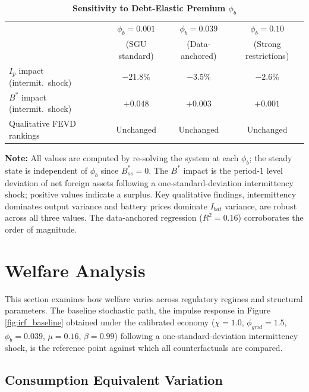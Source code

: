 	\begin{table}[H]
		\centering
		\caption[Sensitivity to Debt-Elastic Premium $\phi_b$]{\textbf{Sensitivity to Debt-Elastic Premium $\phi_b$}}
		\label{tab:phi_b_sensitivity}
		\renewcommand{\arraystretch}{1.3}
		\footnotesize
		\begin{tabular}{l c c c}
			\toprule
			& $\phi_b = 0.001$ & $\phi_b = 0.039$ & $\phi_b = 0.10$ \\
			& (SGU standard) & (Data-anchored) & (Strong restrictions) \\
			\midrule
			$I_p$ impact (intermit.\ shock) & $-21.8\%$ & $-3.5\%$ & $-2.6\%$ \\
			$B^*$ impact (intermit.\ shock) & $+0.048$ & $+0.003$ & $+0.001$ \\
			Qualitative FEVD rankings & Unchanged & Unchanged & Unchanged \\
			\bottomrule
		\end{tabular}
		\vspace{0.2cm}
		\parbox{\linewidth}{\footnotesize \textbf{Note:} All values are computed by re-solving the system at each $\phi_b$; the steady state is independent of $\phi_b$ since $B^*_{ss}=0$. The $B^*$ impact is the period-1 level deviation of net foreign assets following a one-standard-deviation intermittency shock; positive values indicate a surplus. Key qualitative findings, intermittency dominates output variance and battery prices dominate $I_{bat}$ variance, are robust across all three values. The data-anchored regression ($R^2 = 0.16$) corroborates the order of magnitude.}
	\end{table}
	
	\section{Welfare Analysis} \label{sec:welfare}
	
	
	This section examines how welfare varies across regulatory regimes and structural parameters. The baseline stochastic path, the impulse response in Figure \ref{fig:irf_baseline} obtained under the calibrated economy ($\chi = 1.0$, $\phi_{grid} = 1.5$, $\phi_b = 0.039$, $\mu = 0.16$, $\beta = 0.99$) following a one-standard-deviation intermittency shock, is the reference point against which all counterfactuals are compared.

	\subsection{Consumption Equivalent Variation}

